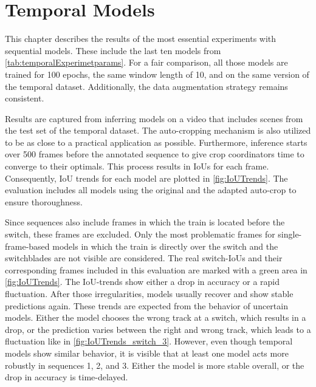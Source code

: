 \section{Temporal Models}

This chapter describes the results of the most essential experiments with sequential models.
These include the last ten models from \autoref{tab:temporalExperimetparams}.
For a fair comparison, all those models are trained for 100 epochs, the same window length of 10, and on the same version of the temporal dataset.
Additionally, the data augmentation strategy remains consistent.

Results are captured from inferring models on a video that includes scenes from the test set of the temporal dataset.
The auto-cropping mechanism is also utilized to be as close to a practical application as possible.
Furthermore, inference starts over 500 frames before the annotated sequence to give crop coordinators time to converge to their optimals.
This process results in \ac{IoU}s for each frame.
Consequently, \ac{IoU} trends for each model are plotted in \autoref{fig:IoUTrends}.
The evaluation includes all models using the original and the adapted auto-crop to ensure thoroughness.

Since sequences also include frames in which the train is located before the switch, these frames are excluded.
Only the most problematic frames for single-frame-based models in which the train is directly over the switch and the switchblades are not visible are considered.
The real switch-\ac{IoU}s and their corresponding frames included in this evaluation are marked with a green area in \autoref{fig:IoUTrends}.
The \ac{IoU}-trends show either a drop in accuracy or a rapid fluctuation.
After those irregularities, models usually recover and show stable predictions again.
These trends are expected from the behavior of uncertain models.
Either the model chooses the wrong track at a switch, which results in a drop, or the prediction varies between the right and wrong track, which leads to a fluctuation like in \autoref{fig:IoUTrends_switch_3}.
However, even though temporal models show similar behavior, it is visible that at least one model acts more robustly in sequences 1, 2, and 3.
Either the model is more stable overall, or the drop in accuracy is time-delayed.

